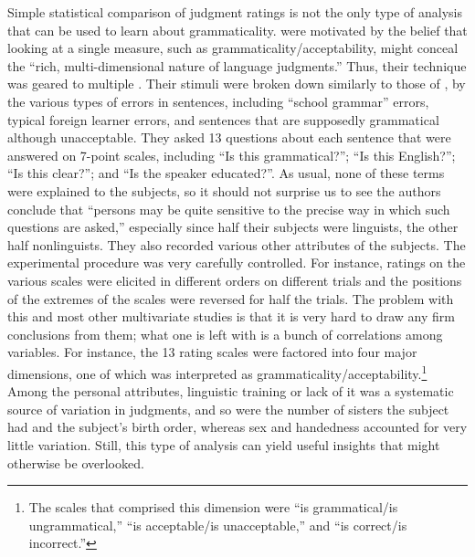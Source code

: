  Simple statistical comparison of judgment ratings is not the only type of analysis that can be used to learn about grammaticality. \citet{BradacEtAl1980} were motivated by the belief that looking at a single measure, such as grammaticality/acceptability, might conceal the ``rich, multi-dimensional nature of language judgments.'' Thus, their technique was geared to multiple . Their stimuli were broken down similarly to those of \citet{MaclayEtAl1960}, by the various types of errors in sentences, including ``school grammar'' errors, typical foreign learner errors, and sentences that are supposedly grammatical although unacceptable. They asked 13 questions about each sentence that were answered on 7-point scales, including ``Is this grammatical?''; ``Is this English?''; ``Is this clear?''; and ``Is the speaker educated?''. As usual, none of these terms were explained to the subjects, so it should not surprise us to see the authors conclude that ``persons may be quite sensitive to the precise way in which such questions are asked,'' especially since half their subjects were linguists, the other half nonlinguists. They also recorded various other attributes of the subjects. The experimental procedure was very carefully controlled. For instance, ratings on the various scales were elicited in different orders on different trials and the positions of the extremes of the scales were reversed for half the trials. The problem with this and most other multivariate studies is that it is very hard to draw any firm conclusions from them; what one is left with is a bunch of correlations among variables. For instance, the 13 rating scales were factored into four major dimensions, one of which was interpreted as grammaticality/acceptability.\footnote{The scales that comprised this dimension were  ``is grammatical/is  ungrammatical,'' ``is acceptable/is unacceptable,'' and ``is correct/is incorrect.''}
 Among the personal attributes, linguistic training or lack of it was a systematic source of variation in judgments, and so were the number of sisters the subject had and the subject's birth order, whereas sex and handedness accounted for very little variation. Still, this type of analysis can yield useful insights that might otherwise be overlooked. 

